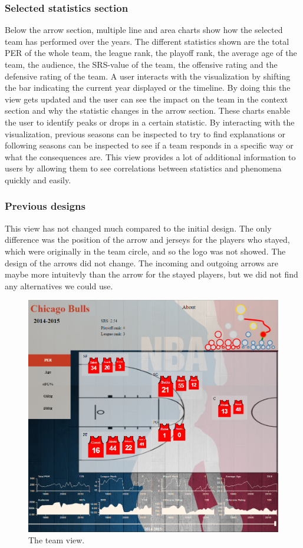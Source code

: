 \documentclass[]{sigchi}
\begin{document}
\subsubsection{Selected statistics section}
Below the arrow section, multiple line and area charts show how the selected 
team has performed over the years. The different statistics shown are the 
total PER of the whole team, the league rank, the playoff rank, the average age 
of the team, the audience, the SRS-value of the team, the offensive rating and 
the defensive rating of the team. A user interacts with the visualization by 
shifting the bar indicating the current year displayed or the timeline. By 
doing this the view gets updated and the user can see the impact on the team 
in the context section and why the statistic changes in the arrow section. 
These charts enable the user to identify peaks or drops in a certain statistic. 
By interacting with the visualization, previous seasons can be inspected to try 
to find explanations or following seasons can be inspected to see if a team 
responds in a specific way or what the consequences are. This view provides 
a lot of additional information to users by allowing them to see correlations 
between statistics and phenomena quickly and easily.

\subsubsection{Previous designs}
This view has not changed much compared to the initial design. The only difference 
was the position of the arrow and jerseys for the players who stayed, which were 
originally in the team circle, and so the logo was not showed. 
The design of the arrows did not change. The incoming and outgoing 
arrows are maybe more intuitevly than the arrow for the stayed players, but we did 
not find any alternatives we could use.

\begin{figure}
\centering
  \includegraphics[width=1.0\columnwidth]{figures/teamview}
  \caption{The team view.}
  \label{fig:teamview}
\end{figure}
\end{document}
